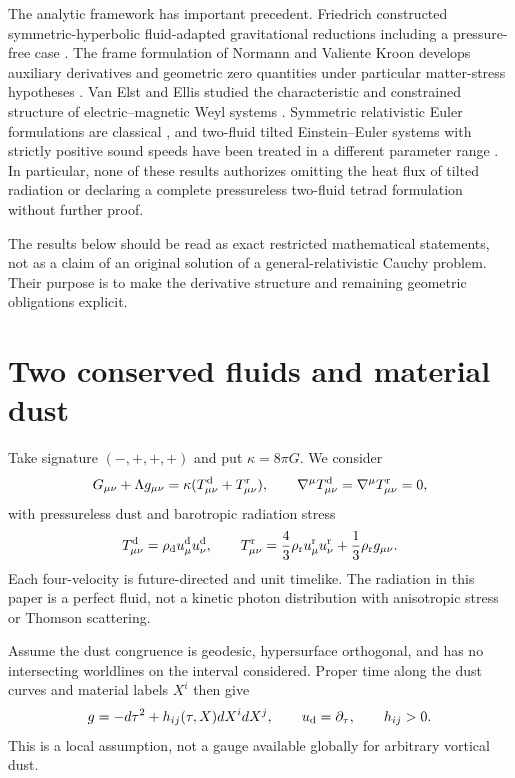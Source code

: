 \documentclass[10pt,a4paper]{article}
\newcommand{\kgr}{\kappa}
\begin{document}
The analytic framework has important precedent. Friedrich constructed symmetric-hyperbolic fluid-adapted gravitational reductions including a pressure-free case \cite{Friedrich}. The frame formulation of Normann and Valiente Kroon develops auxiliary derivatives and geometric zero quantities under particular matter-stress hypotheses \cite{NormannVK}. Van Elst and Ellis studied the characteristic and constrained structure of electric--magnetic Weyl systems \cite{vanElstEllis}. Symmetric relativistic Euler formulations are classical \cite{Walton}, and two-fluid tilted Einstein--Euler systems with strictly positive sound speeds have been treated in a different parameter range \cite{FMO}. In particular, none of these results authorizes omitting the heat flux of tilted radiation or declaring a complete pressureless two-fluid tetrad formulation without further proof.

The results below should be read as exact restricted mathematical statements, not as a claim of an original solution of a general-relativistic Cauchy problem. Their purpose is to make the derivative structure and remaining geometric obligations explicit.

\section{Two conserved fluids and material dust}
Take signature $(-,+,+,+)$ and put $\kgr=8\pi G$. We consider
\begin{equation}\label{eq:einstein}
G_{\mu\nu}+\Lambda g_{\mu\nu}=\kgr(T^{\rm d}_{\mu\nu}+T^{\rm r}_{\mu\nu}),\qquad
\nabla^\mu T^{\rm d}_{\mu\nu}=\nabla^\mu T^{\rm r}_{\mu\nu}=0,
\end{equation}
with pressureless dust and barotropic radiation stress
\begin{equation}\label{eq:stress}
T^{\rm d}_{\mu\nu}=\rho_{\rm d}u^{\rm d}_\mu u^{\rm d}_\nu,
\qquad T^{\rm r}_{\mu\nu}=\frac43\rho_{\rm r}u^{\rm r}_\mu u^{\rm r}_\nu
+\frac13\rho_{\rm r}g_{\mu\nu}.
\end{equation}
Each four-velocity is future-directed and unit timelike. The radiation in this paper is a perfect fluid, not a kinetic photon distribution with anisotropic stress or Thomson scattering.

Assume the dust congruence is geodesic, hypersurface orthogonal, and has no intersecting worldlines on the interval considered. Proper time along the dust curves and material labels $X^i$ then give
\begin{equation}\label{eq:metric}
g=-d\tau^2+h_{ij}(\tau,X)dX^i dX^j,\qquad u_{\rm d}=\partial_\tau,
\qquad h_{ij}>0.
\end{equation}
This is a local assumption, not a gauge available globally for arbitrary vortical dust.
\end{document}
